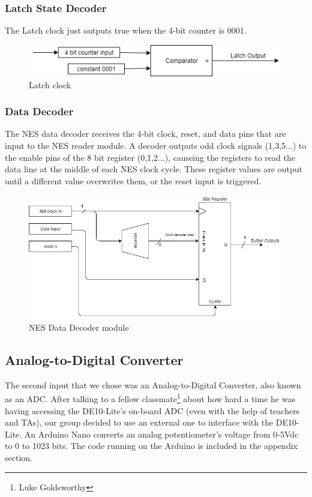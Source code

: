\documentclass[a4paper]{article}
\begin{document}
\subsubsection{Latch State Decoder}
The Latch clock just outputs true when the 4-bit counter is 0001.

\begin{figure}[H]
    \includegraphics[width=0.8 \linewidth]{images/LatchMod.JPG}
    \caption{Latch clock}
    \label{Latchclock}
\end{figure}

\subsubsection{Data Decoder}

The NES data decoder receives the 4-bit clock, reset, and data pins that are input to the NES reader module. A decoder outputs odd clock signals (1,3,5...) to the enable pins of the 8 bit register (0,1,2...), causeing the registers to read the data line at the middle of each NES clock cycle. These register values are output until a different value overwrites them, or the reset input is triggered. 

\begin{figure}[H]
    \includegraphics[width=0.8 \linewidth]{images/NESDataDecoder.JPG}
    \caption{NES Data Decoder module}
    \label{DataDecoder}
\end{figure}

\subsection{Analog-to-Digital Converter}
The second input that we chose was an Analog-to-Digital Converter, also known as an ADC. After talking to a fellow classmate\footnote{Luke Goldsworthy} about how hard a time he was having accessing the DE10-Lite's on-board ADC (even with the help of teachers and TAs), our group decided to use an external one to interface with the DE10-Lite. An Arduino Nano converts an analog potentiometer's voltage from 0-5Vdc  to 0 to 1023 bits. The code running on the Arduino is included in the appendix section. 
\end{document}

